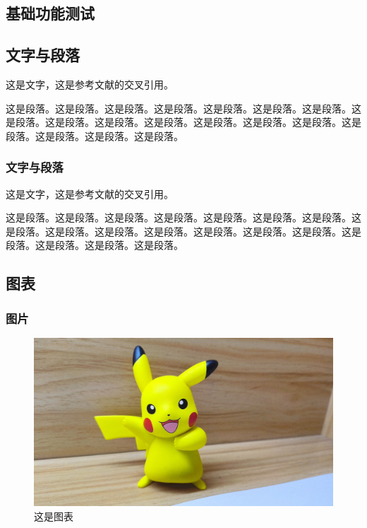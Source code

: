 \begin{ujnbody}
    \section{基础功能测试}
    \subsection{文字与段落}
    这是文字，这是参考文献的交叉引用\cite{shannon1948mathematical}。

    这是段落。这是段落。这是段落。这是段落。这是段落。这是段落。这是段落。这是段落。这是段落。这是段落。这是段落。这是段落。这是段落。这是段落。这是段落。这是段落。这是段落。这是段落。
    \subsubsection{文字与段落}
    这是文字，这是参考文献的交叉引用\cite{nash1996non}。

    这是段落。这是段落。这是段落。这是段落。这是段落。这是段落。这是段落。这是段落。这是段落。这是段落。这是段落。这是段落。这是段落。这是段落。这是段落。这是段落。这是段落。这是段落。
    \subsection{图表}

    \subsubsection{图片}

    \begin{figure}[htbp]
        \centering
        \includegraphics[scale=0.1, ]{figures/pikachu.jpg}
        \caption{这是图表}
    \end{figure}


\end{ujnbody}
